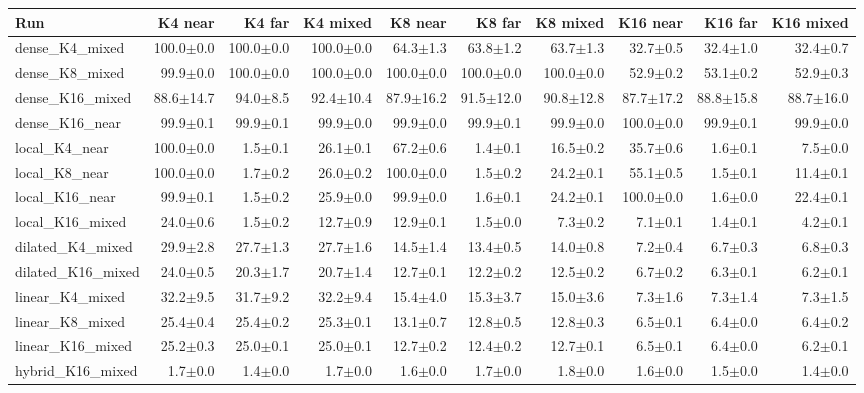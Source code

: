 \scriptsize
\setlength{\tabcolsep}{3.5pt}
\label{tab:t2bgrid}
\begin{adjustbox}{max width=\linewidth}
\begin{tabular}{lrrrrrrrrr}
\toprule
Run & K4 near & K4 far & K4 mixed & K8 near & K8 far & K8 mixed & K16 near & K16 far & K16 mixed \\
\midrule
dense\_K4\_mixed & 100.0$\pm$0.0 & 100.0$\pm$0.0 & 100.0$\pm$0.0 & 64.3$\pm$1.3 & 63.8$\pm$1.2 & 63.7$\pm$1.3 & 32.7$\pm$0.5 & 32.4$\pm$1.0 & 32.4$\pm$0.7 \\
dense\_K8\_mixed & 99.9$\pm$0.0 & 100.0$\pm$0.0 & 100.0$\pm$0.0 & 100.0$\pm$0.0 & 100.0$\pm$0.0 & 100.0$\pm$0.0 & 52.9$\pm$0.2 & 53.1$\pm$0.2 & 52.9$\pm$0.3 \\
dense\_K16\_mixed & 88.6$\pm$14.7 & 94.0$\pm$8.5 & 92.4$\pm$10.4 & 87.9$\pm$16.2 & 91.5$\pm$12.0 & 90.8$\pm$12.8 & 87.7$\pm$17.2 & 88.8$\pm$15.8 & 88.7$\pm$16.0 \\
dense\_K16\_near & 99.9$\pm$0.1 & 99.9$\pm$0.1 & 99.9$\pm$0.0 & 99.9$\pm$0.0 & 99.9$\pm$0.1 & 99.9$\pm$0.0 & 100.0$\pm$0.0 & 99.9$\pm$0.1 & 99.9$\pm$0.0 \\
local\_K4\_near & 100.0$\pm$0.0 & 1.5$\pm$0.1 & 26.1$\pm$0.1 & 67.2$\pm$0.6 & 1.4$\pm$0.1 & 16.5$\pm$0.2 & 35.7$\pm$0.6 & 1.6$\pm$0.1 & 7.5$\pm$0.0 \\
local\_K8\_near & 100.0$\pm$0.0 & 1.7$\pm$0.2 & 26.0$\pm$0.2 & 100.0$\pm$0.0 & 1.5$\pm$0.2 & 24.2$\pm$0.1 & 55.1$\pm$0.5 & 1.5$\pm$0.1 & 11.4$\pm$0.1 \\
local\_K16\_near & 99.9$\pm$0.1 & 1.5$\pm$0.2 & 25.9$\pm$0.0 & 99.9$\pm$0.0 & 1.6$\pm$0.1 & 24.2$\pm$0.1 & 100.0$\pm$0.0 & 1.6$\pm$0.0 & 22.4$\pm$0.1 \\
local\_K16\_mixed & 24.0$\pm$0.6 & 1.5$\pm$0.2 & 12.7$\pm$0.9 & 12.9$\pm$0.1 & 1.5$\pm$0.0 & 7.3$\pm$0.2 & 7.1$\pm$0.1 & 1.4$\pm$0.1 & 4.2$\pm$0.1 \\
dilated\_K4\_mixed & 29.9$\pm$2.8 & 27.7$\pm$1.3 & 27.7$\pm$1.6 & 14.5$\pm$1.4 & 13.4$\pm$0.5 & 14.0$\pm$0.8 & 7.2$\pm$0.4 & 6.7$\pm$0.3 & 6.8$\pm$0.3 \\
dilated\_K16\_mixed & 24.0$\pm$0.5 & 20.3$\pm$1.7 & 20.7$\pm$1.4 & 12.7$\pm$0.1 & 12.2$\pm$0.2 & 12.5$\pm$0.2 & 6.7$\pm$0.2 & 6.3$\pm$0.1 & 6.2$\pm$0.1 \\
linear\_K4\_mixed & 32.2$\pm$9.5 & 31.7$\pm$9.2 & 32.2$\pm$9.4 & 15.4$\pm$4.0 & 15.3$\pm$3.7 & 15.0$\pm$3.6 & 7.3$\pm$1.6 & 7.3$\pm$1.4 & 7.3$\pm$1.5 \\
linear\_K8\_mixed & 25.4$\pm$0.4 & 25.4$\pm$0.2 & 25.3$\pm$0.1 & 13.1$\pm$0.7 & 12.8$\pm$0.5 & 12.8$\pm$0.3 & 6.5$\pm$0.1 & 6.4$\pm$0.0 & 6.4$\pm$0.2 \\
linear\_K16\_mixed & 25.2$\pm$0.3 & 25.0$\pm$0.1 & 25.0$\pm$0.1 & 12.7$\pm$0.2 & 12.4$\pm$0.2 & 12.7$\pm$0.1 & 6.5$\pm$0.1 & 6.4$\pm$0.0 & 6.2$\pm$0.1 \\
hybrid\_K16\_mixed & 1.7$\pm$0.0 & 1.4$\pm$0.0 & 1.7$\pm$0.0 & 1.6$\pm$0.0 & 1.7$\pm$0.0 & 1.8$\pm$0.0 & 1.6$\pm$0.0 & 1.5$\pm$0.0 & 1.4$\pm$0.0 \\
\bottomrule
\end{tabular}
\end{adjustbox}
